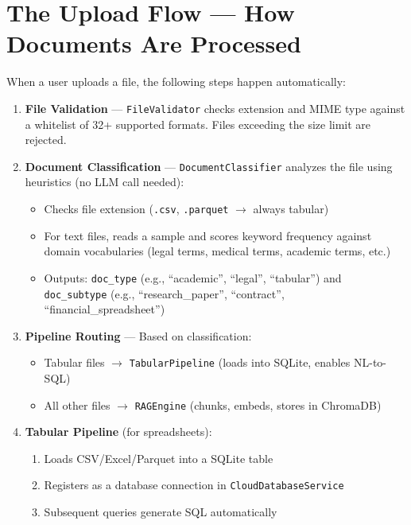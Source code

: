 \documentclass[12pt, a4paper, oneside]{report}
\newcommand{\kw}[1]{\texttt{\small #1}}
\begin{document}
\section{The Upload Flow — How Documents Are Processed}

When a user uploads a file, the following steps happen automatically:

\begin{enumerate}
  \item \textbf{File Validation} — \kw{FileValidator} checks extension and MIME type against
        a whitelist of 32+ supported formats. Files exceeding the size limit are rejected.

  \item \textbf{Document Classification} — \kw{DocumentClassifier} analyzes the file using
        heuristics (no LLM call needed):
        \begin{itemize}
          \item Checks file extension (\kw{.csv}, \kw{.parquet} \(\rightarrow\) always tabular)
          \item For text files, reads a sample and scores keyword frequency against domain
                vocabularies (legal terms, medical terms, academic terms, etc.)
          \item Outputs: \kw{doc\_type} (e.g., ``academic'', ``legal'', ``tabular'') and
                \kw{doc\_subtype} (e.g., ``research\_paper'', ``contract'',
                ``financial\_spreadsheet'')
        \end{itemize}

  \item \textbf{Pipeline Routing} — Based on classification:
        \begin{itemize}
          \item Tabular files \(\rightarrow\) \kw{TabularPipeline} (loads into SQLite, enables NL-to-SQL)
          \item All other files \(\rightarrow\) \kw{RAGEngine} (chunks, embeds, stores in ChromaDB)
        \end{itemize}

  \item \textbf{Tabular Pipeline} (for spreadsheets):
        \begin{enumerate}
          \item Loads CSV/Excel/Parquet into a SQLite table
          \item Registers as a database connection in \kw{CloudDatabaseService}
          \item Subsequent queries generate SQL automatically
        \end{enumerate}


\end{enumerate}
\end{document}
